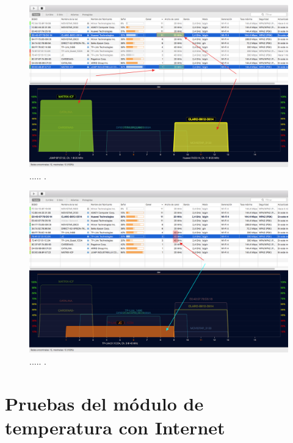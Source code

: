 \begin{landscape} %
\begin{figure}[htpb]
\centering 
\includegraphics[width=1.5\textwidth]{./Figures/wifi/05.png}
\caption{..... .}
\label{fig:test05}
\end{figure}
\end{landscape} %



\begin{landscape} %
\begin{figure}[htpb]
\centering 
\includegraphics[width=1.5\textwidth]{./Figures/wifi/06.png}
\caption{..... .}
\label{fig:test06}
\end{figure}
\end{landscape} %


\section{Pruebas del módulo de temperatura con Internet}
